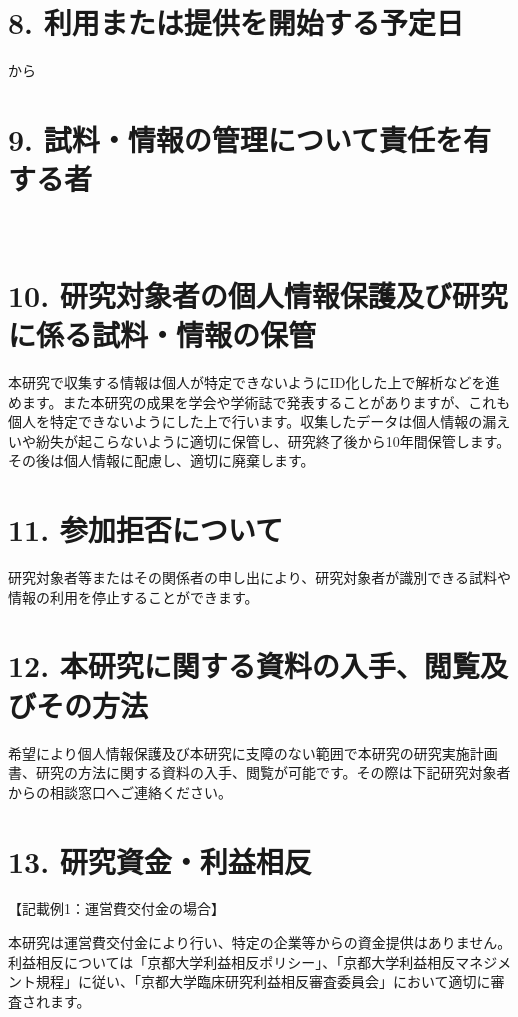 \documentclass[a4paper,11pt,lualatex,ja=standard]{bxjsarticle}
\begin{document}
\section*{8. 利用または提供を開始する予定日}

\StudyStart から

\section*{9. 試料・情報の管理について責任を有する者}

\InstitutionName\ %

\section*{10. 研究対象者の個人情報保護及び研究に係る試料・情報の保管}

本研究で収集する情報は個人が特定できないようにID化した上で解析などを進めます。また本研究の成果を学会や学術誌で発表することがありますが、これも個人を特定できないようにした上で行います。収集したデータは個人情報の漏えいや紛失が起こらないように適切に保管し、研究終了後から10年間保管します。その後は個人情報に配慮し、適切に廃棄します。

\section*{11. 参加拒否について}

研究対象者等またはその関係者の申し出により、研究対象者が識別できる試料や情報の利用を停止することができます。

\section*{12. 本研究に関する資料の入手、閲覧及びその方法}

希望により個人情報保護及び本研究に支障のない範囲で本研究の研究実施計画書、研究の方法に関する資料の入手、閲覧が可能です。その際は下記研究対象者からの相談窓口へご連絡ください。

\section*{13. 研究資金・利益相反}

\noindent
【記載例1：運営費交付金の場合】

\noindent
本研究は運営費交付金により行い、特定の企業等からの資金提供はありません。利益相反については「京都大学利益相反ポリシー」、「京都大学利益相反マネジメント規程」に従い、「京都大学臨床研究利益相反審査委員会」において適切に審査されます。
\end{document}
